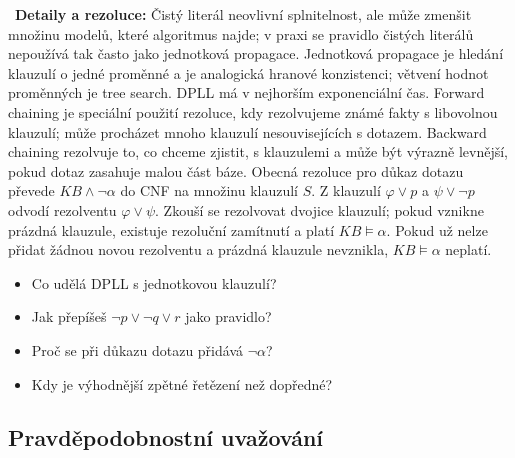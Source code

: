 \begin{odpoved}
\noindent{}\ \textbf{Detaily a rezoluce:} Čistý literál neovlivní splnitelnost, ale může zmenšit množinu modelů, které algoritmus najde; v praxi se pravidlo čistých literálů nepoužívá tak často jako jednotková propagace. Jednotková propagace je hledání klauzulí o jedné proměnné a je analogická hranové konzistenci; větvení hodnot proměnných je tree search. DPLL má v nejhorším exponenciální čas. Forward chaining je speciální použití rezoluce, kdy rezolvujeme známé fakty s libovolnou klauzulí; může procházet mnoho klauzulí nesouvisejících s dotazem. Backward chaining rezolvuje to, co chceme zjistit, s klauzulemi a může být výrazně levnější, pokud dotaz zasahuje malou část báze. Obecná rezoluce pro důkaz dotazu převede $KB\land\neg\alpha$ do CNF na množinu klauzulí $S$. Z klauzulí $\varphi\lor p$ a $\psi\lor\neg p$ odvodí rezolventu $\varphi\lor\psi$. Zkouší se rezolvovat dvojice klauzulí; pokud vznikne prázdná klauzule, existuje rezoluční zamítnutí a platí $KB\models\alpha$. Pokud už nelze přidat žádnou novou rezolventu a prázdná klauzule nevznikla, $KB\models\alpha$ neplatí.
\end{odpoved}

\begin{recall}
\begin{itemize}[leftmargin=1.2em,itemsep=0pt,topsep=1pt]
  \item Co udělá DPLL s jednotkovou klauzulí?
  \item Jak přepíšeš $\neg p\lor\neg q\lor r$ jako pravidlo?
  \item Proč se při důkazu dotazu přidává $\neg\alpha$?
  \item Kdy je výhodnější zpětné řetězení než dopředné?
\end{itemize}
\end{recall}

\subsection{Pravděpodobnostní uvažování}


